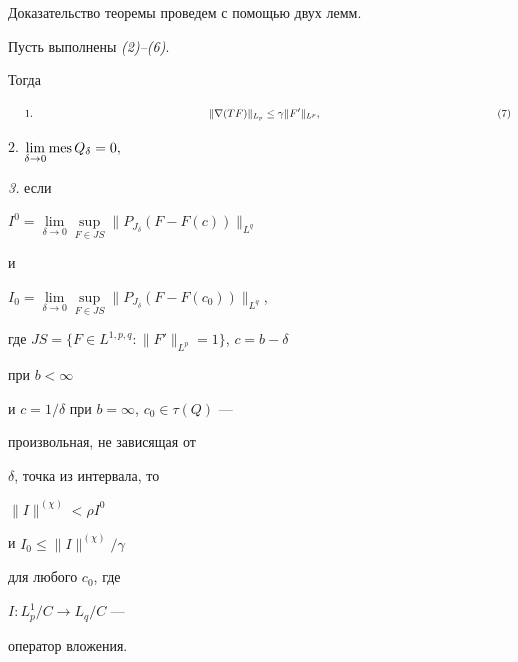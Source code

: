 Доказательство теоремы проведем с помощью двух лемм.





\begin{lem} Пусть выполнены {\em (2)--(6)}.


Тогда


$$


\hspace{\parindent}1.


\hspace{5.8cm} \|\nabla(TF)\|_{L_p}\le \gamma \|F'\|_{L^p},


\hspace{5.8cm} (7)


$$





$2.$ $\lim\limits_{\delta\to 0}\operatorname{mes} Q_{\delta}= 0,$








{\em 3.} если


$I^0=\lim\limits_{\delta\to 0} \sup\limits_{F\in JS}


\|P_{J_{\delta}}(F-F(c))\|_{L^q}$


и


$I_0=\lim\limits_{\delta\to 0} \sup\limits_{F\in JS}\|P_{J_{\delta}}


(F-F(c_0))\|_{L^q}$,


где $JS=\{F\in L^{1,p,q}:\|F'\|_{L^p}=1\}$, $c=b-\delta$


при $b<\infty$


и $c=1/\delta$ при $b=\infty$, $c_0\in \tau(Q)$ ---


произвольная, не зависящая от


$\delta$, точка из интервала, то


$\|I\|^{(\chi)}<\rho I^0$


и $I_0\le \|I\|^{(\chi)}/\gamma$


для любого $c_0$, где


$I:L^1_p/C\to L_q/C$ ---


оператор вложения.


\end{lem}





